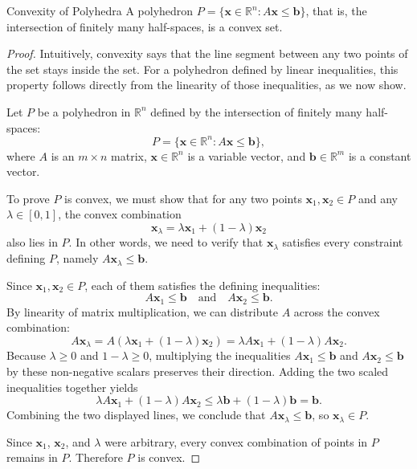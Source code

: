 %
\begin{theorem}{Convexity of Polyhedra}
\label{thm:polyhedra_convex}
A polyhedron \( P = \{\mathbf{x} \in \mathbb{R}^n : A\mathbf{x} \leq \mathbf{b}\} \), that is, the intersection of finitely many half-spaces, is a convex set.
\end{theorem}
%
\begin{proof}
Intuitively, convexity says that the line segment between any two points of the set stays inside the set. For a polyhedron defined by linear inequalities, this property follows directly from the linearity of those inequalities, as we now show.

Let \( P \) be a polyhedron in \(\mathbb{R}^n\) defined by the intersection of finitely many half-spaces:
\[
P = \{\mathbf{x} \in \mathbb{R}^n : A\mathbf{x} \leq \mathbf{b}\},
\]
where \(A\) is an \(m \times n\) matrix, \(\mathbf{x} \in \mathbb{R}^n\) is a variable vector, and \(\mathbf{b} \in \mathbb{R}^m\) is a constant vector.

To prove \(P\) is convex, we must show that for any two points \(\mathbf{x}_1, \mathbf{x}_2 \in P\) and any \(\lambda \in [0, 1]\), the convex combination
\[
\mathbf{x}_\lambda = \lambda \mathbf{x}_1 + (1 - \lambda) \mathbf{x}_2
\]
also lies in \(P\). In other words, we need to verify that \(\mathbf{x}_\lambda\) satisfies every constraint defining \(P\), namely \(A\mathbf{x}_\lambda \leq \mathbf{b}\).

Since \(\mathbf{x}_1, \mathbf{x}_2 \in P\), each of them satisfies the defining inequalities:
\[
A\mathbf{x}_1 \leq \mathbf{b} \quad \text{and} \quad A\mathbf{x}_2 \leq \mathbf{b}.
\]
By linearity of matrix multiplication, we can distribute \(A\) across the convex combination:
\[
A\mathbf{x}_\lambda = A(\lambda \mathbf{x}_1 + (1 - \lambda) \mathbf{x}_2) = \lambda A\mathbf{x}_1 + (1 - \lambda) A\mathbf{x}_2.
\]
Because \(\lambda \geq 0\) and \(1-\lambda \geq 0\), multiplying the inequalities \(A\mathbf{x}_1 \leq \mathbf{b}\) and \(A\mathbf{x}_2 \leq \mathbf{b}\) by these non-negative scalars preserves their direction. Adding the two scaled inequalities together yields
\[
\lambda A\mathbf{x}_1 + (1 - \lambda) A\mathbf{x}_2 \leq \lambda \mathbf{b} + (1 - \lambda) \mathbf{b} = \mathbf{b}.
\]
Combining the two displayed lines, we conclude that \(A\mathbf{x}_\lambda \leq \mathbf{b}\), so \(\mathbf{x}_\lambda \in P\).

Since \(\mathbf{x}_1\), \(\mathbf{x}_2\), and \(\lambda\) were arbitrary, every convex combination of points in \(P\) remains in \(P\). Therefore \(P\) is convex.
\end{proof}
%
%

